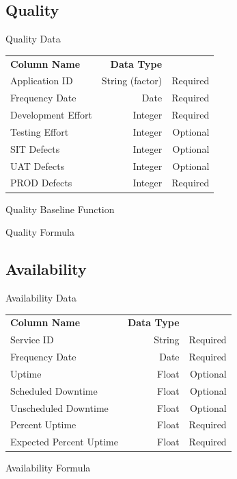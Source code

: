     \subsection{Quality}
        \begin{frame}{Quality Data}
            \centering
            \begin{tabular}{l | r | r}
                 {\bfseries Column Name}
                 & {\bfseries Data Type}
                 &  \\
                
                Application ID & String (factor) & Required \\
                \myrowcolour%
                Frequency Date & Date & Required \\
                Development Effort & Integer & Required \\
                \myrowcolour%
                Testing Effort & Integer & Optional \\ 
                SIT Defects & Integer & Optional \\ 
                \myrowcolour%
                UAT Defects & Integer  & Optional \\ 
                PROD Defects & Integer  & Required \\
                
            \end{tabular}
        \end{frame} 
        \begin{frame}{Quality Baseline Function}
        \end{frame} 
        \begin{frame}{Quality Formula}
        \end{frame} 
    \subsection{Availability}
        \begin{frame}{Availability Data}
            \centering
            \begin{tabular}{l | r | r}
            {\bfseries Column Name}
                 & {\bfseries Data Type}
                 &  \\
                
                Service ID & String  & Required \\
                \myrowcolour%
                Frequency Date & Date & Required \\
                Uptime & Float & Optional \\
                \myrowcolour%
                Scheduled Downtime & Float & Optional \\
                Unscheduled Downtime & Float  & Optional \\
                \myrowcolour%
                Percent Uptime & Float & Required \\
                Expected Percent Uptime & Float & Required \\
            \end{tabular}
        \end{frame} 
        \begin{frame}{Availability Formula }
        \end{frame} 
